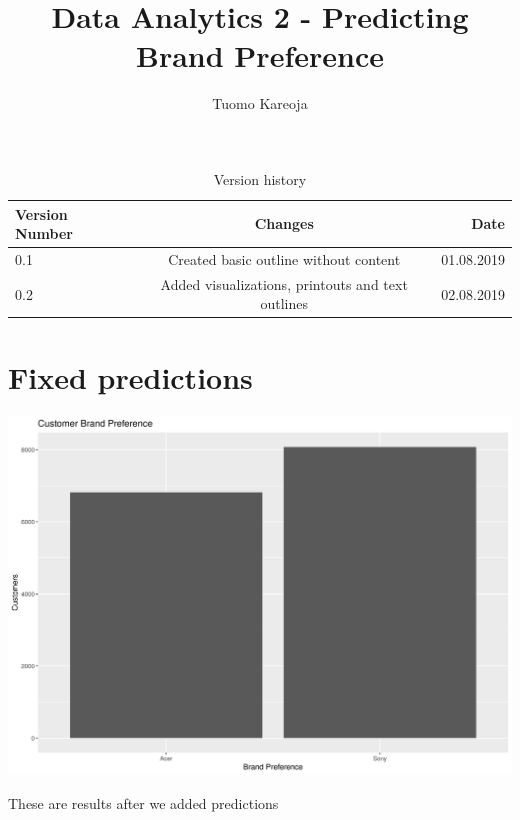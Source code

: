 \documentclass[12pt,a4paper,leqno]{report}
\title{Data Analytics 2 - Predicting Brand Preference}
\author{Tuomo Kareoja}
\date{}
\theoremstyle{plain}
\theoremstyle{definition}
\theoremstyle{remark}
\begin{document}
\maketitle

\begin{table}[h!]
  \begin{center}
    \caption{Version history}
    \begin{tabular}{l|c|r}
      \textbf{Version Number} & \textbf{Changes} & \textbf{Date} \\
      \hline
      0.1 & Created basic outline without content & 01.08.2019\\
      0.2 & Added visualizations, printouts and text outlines & 02.08.2019\\
    \end{tabular}
  \end{center}
\end{table}

\newpage

\section{Fixed predictions}


\bigskip
{
    \centering
    \includegraphics[width=\textwidth,height=\textheight,keepaspectratio]{brand_preference_plain.png}
    \par
}
\bigskip

These are results after we added predictions
\end{document}
